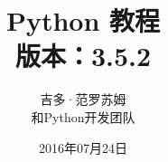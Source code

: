 \title{\textbf{{\Huge Python 教程}\\版本：3.5.2}}
\author{吉多·范罗苏姆 \\和Python开发团队}
\date{2016年07月24日}
\maketitle 